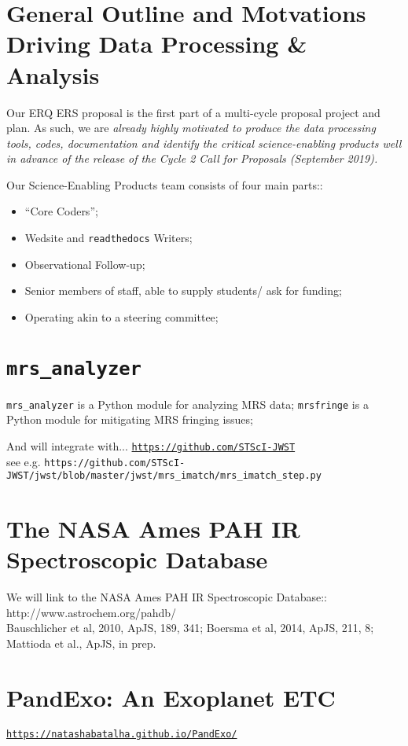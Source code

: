 
\section{General Outline and Motvations Driving Data Processing \& Analysis}
Our ERQ ERS proposal is the first part of a multi-cycle proposal project and plan. 
As such, we are {\it already highly motivated to produce the data processing tools, codes, documentation 
and identify the critical science-enabling products well in advance of the release of the Cycle 2 Call for Proposals (September 2019).} 

Our Science-Enabling Products team consists of four main parts::
\begin{itemize}
    \item ``Core Coders''; 
    \item  Wedsite and {\tt readthedocs} Writers; 
    \item Observational Follow-up; 
    \item Senior members of staff, able to supply students/ ask for funding; 
    \item Operating akin to a steering committee; 
\end{itemize}


\section{{\tt mrs\_analyzer}} 
{\tt mrs\_analyzer} is  a Python module for analyzing MRS data; 
{\tt mrsfringe} is a Python module for mitigating MRS fringing issues; 

And will integrate with...
\href{https://github.com/STScI-JWST}{\tt https://github.com/STScI-JWST} \\
see e.g. 
{\tt https://github.com/STScI-JWST/jwst/blob/master/jwst/mrs\_imatch/mrs\_imatch\_step.py}

\section{The NASA Ames PAH IR Spectroscopic Database}
We will link to the NASA Ames PAH IR Spectroscopic Database:: \\
http://www.astrochem.org/pahdb/ \\
Bauschlicher et al, 2010, ApJS, 189, 341; Boersma et al, 2014, ApJS, 211, 8;  Mattioda et al., ApJS, in prep.\\


\section{PandExo: An Exoplanet ETC}
\href{https://natashabatalha.github.io/PandExo/}{\tt https://natashabatalha.github.io/PandExo/}


